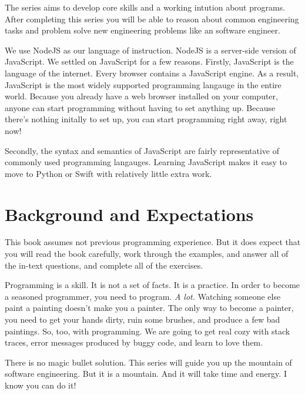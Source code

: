 The series aims to develop core skills and a working intution about programs. After completing this series you will be able to reason about common engineering tasks and problem solve new engineering problems like an software engineer.

We use NodeJS as our language of instruction. NodeJS is a server-side version of JavaScript. We settled on JavaScript for a few reasons. Firstly, JavaScript is the language of the internet. Every browser contains a JavaScript engine. As a result, JavaScript is the most widely supported programming langauge in the entire world. Because you already have a web browser installed on your computer, anyone can start programming without having to set anything up. Because there's nothing initally to set up, you can start programming right away, right now!

Secondly, the syntax and semantics of JavaScript are fairly representative of commonly used programming langauges. Learning JavaScript makes it easy to move to Python or Swift with relatively little extra work.

\section*{Background and Expectations}
This book assumes not previous programming experience. But it does expect that you will read the book carefully, work through the examples, and answer all of the in-text questions, and complete all of the exercises.

Programming is a skill. It is not a set of facts. It is a practice. In order to become a seasoned programmer, you need to program. \emph{A lot.} Watching someone else paint a painting doesn't make you a painter. The only way to become a painter, you need to get your hands dirty, ruin some brushes, and produce a few bad paintings. So, too, with programming. We are going to get real cozy with stack traces, error messages produced by buggy code, and learn to love them.

There is no magic bullet solution. This series will guide you up the mountain of software engineering. But it is a mountain. And it will take time and energy. I know you can do it!
